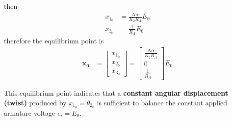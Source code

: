 \documentclass[]{article}
\begin{document}
then
\begin{align*}
	x_{1_0} & = \frac{N \alpha}{K_2 R_A} E_0 \\
	x_{3_0} & = \frac{1}{R_A} E_0
\end{align*}
therefore the equilibrium point is
\begin{align}
	\mathbf{x_0} &= 
	\begin{bmatrix}
		x_{1_0} \\
		x_{2_0} \\
		x_{3_0}
	\end{bmatrix}
	=
	\begin{bmatrix}
		\frac{N \alpha}{K_2 R_A} \\
		0 \\
		\frac{1}{R_A}
	\end{bmatrix}
	E_0
\end{align}

This equilibrium point indicates that a \textbf{constant angular displacement (twist)} produced by $x_{1_0}=\theta_{2_0}$ is sufficient to balance the constant applied armature voltage $e_i=E_0$.
\end{document}
